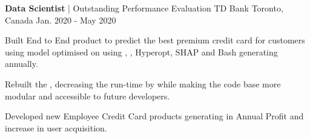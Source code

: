\begin{cventries}
  \cventry
    {\textbf{Data Scientist} | Outstanding Performance Evaluation} %
    {TD Bank} %
    {Toronto, Canada} %
    {Jan. 2020 - May 2020} %
    {
      \begin{cvitems} %
        \item {Built End to End product to predict the best premium credit card for customers using  model optimised on  using , , Hyperopt, SHAP and Bash generating  annually.}
        \item {Rebuilt the , decreasing the run-time by  while making the code base more modular and accessible to future developers.}
        \item {Developed new Employee Credit Card products generating  in Annual Profit and  increase in user acquisition.}
      \end{cvitems}
    }


\end{cventries}

